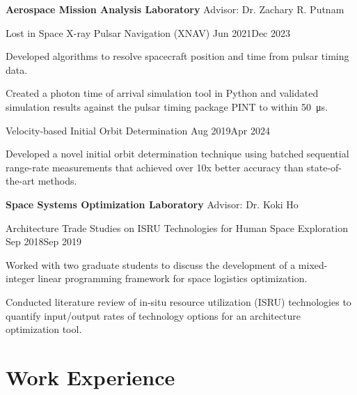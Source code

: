 \documentclass[letterpaper,12pt]{article}
\begin{document}
	\textbf{Aerospace Mission Analysis Laboratory} 
	\hfill Advisor: Dr. Zachary R. Putnam
	
	\begin{ResearchExperience}
		{Lost in Space X-ray Pulsar Navigation (XNAV)}
		{Jun 2021}{Dec 2023}
			\item Developed algorithms to resolve spacecraft position and time from pulsar timing data.
			\item Created a photon time of arrival simulation tool in Python and validated simulation results against the pulsar timing package PINT to within \qty{50}{\micro\s}.
	\end{ResearchExperience}

	\begin{ResearchExperience}
		{Velocity-based Initial Orbit Determination}
		{Aug 2019}{Apr 2024}
			\item Developed a novel initial orbit determination technique using batched sequential range-rate measurements that achieved over 10x better accuracy than state-of-the-art methods.\hspace{-1em}
	\end{ResearchExperience}


	\textbf{Space Systems Optimization Laboratory} 
	\hfill Advisor: Dr. Koki Ho
	
	\begin{ResearchExperience}
		{Architecture Trade Studies on ISRU Technologies for Human Space Exploration}
		{Sep 2018}{Sep 2019}
			\item Worked with two graduate students to discuss the development of a mixed-integer linear programming framework for space logistics optimization.
			\item Conducted literature review of in-situ resource utilization (ISRU) technologies to quantify input/output rates of technology options for an architecture optimization tool.
	\end{ResearchExperience}
	

	
	
	\section{Work Experience}
	
\end{document}

